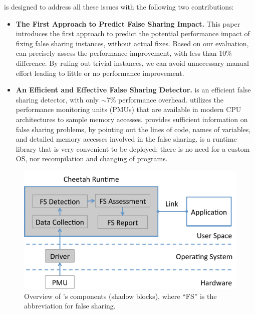 \Cheetah{} is designed to address all these issues with the following two contributions:
\begin{itemize} 

\item {\bf The First Approach to Predict False Sharing Impact.} This paper introduces the first approach to predict the potential performance impact of fixing false sharing instances, without actual fixes. Based on our evaluation, \cheetah{} can precisely assess the performance improvement, with less than 10\% difference. By ruling out trivial instances, we can avoid unnecessary manual effort leading to little or no performance improvement. 

\item {\bf An Efficient and Effective False Sharing Detector.} \cheetah{} is an efficient false sharing detector, with only $\sim$7\% performance overhead. \Cheetah{} utilizes the performance monitoring units (PMUs) that are available in modern CPU architectures to sample memory accesses. \Cheetah{} provides sufficient information on false sharing problems, by pointing out the lines of code, names of variables, and detailed memory accesses involved in the false sharing. \Cheetah{} is a runtime library that is very convenient to be deployed; there is no need for a custom OS, nor recompilation and changing of programs. 

\end{itemize}

\begin{figure}[htbp]
\centering
\includegraphics[width=1\columnwidth]{figure/cheetahcomponents}
\caption{Overview of \cheetah{}'s components (shadow blocks), where ``FS'' is the abbreviation for false sharing.}
\label{fig:components}
\end{figure}



